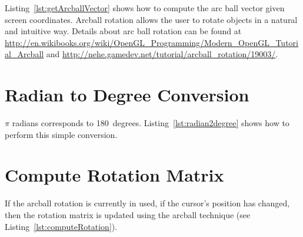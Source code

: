 \documentclass[11pt,oneside,a4paper,final]{article}
\begin{document}
   Listing~\ref{lst:getArcballVector} shows how to compute the arc ball vector given screen coordinates. 
   Arcball rotation allows the user to rotate objects in a natural and intuitive way. 
  Details about arc ball rotation can be found at \url{http://en.wikibooks.org/wiki/OpenGL_Programming/Modern_OpenGL_Tutorial_Arcball} and \url{http://nehe.gamedev.net/tutorial/arcball_rotation/19003/}. 

\begin{center}

\end{center}


\section{Radian to Degree Conversion}
\label{radian2degree}

$\pi$ radians corresponds to 180~degrees. 
Listing~\ref{lst:radian2degree} shows how to perform this simple conversion. 

\begin{center}

\end{center}


\section{Compute Rotation Matrix}
\label{computeRotation}

If the arcball rotation is currently in used, if the cursor's position has changed, then the rotation matrix is updated using the arcball technique
(see Listing~\ref{lst:computeRotation}). 

\begin{center}

\end{center}

	
\end{document}

